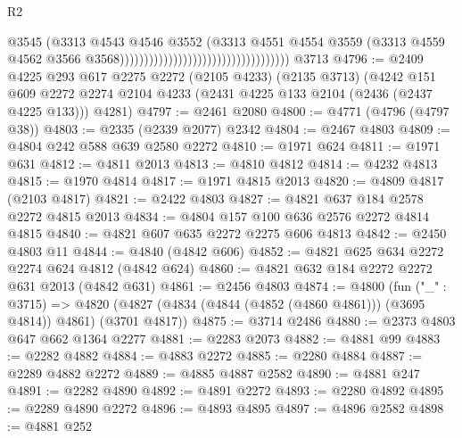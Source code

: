 \begin{lexlean}{R2}
\begin{coremodule}
                                                                    @3545
                                                                    (@3313
                                                                      @4543
                                                                      @4546
                                                                      @3552
                                                                      (@3313
                                                                        @4551
                                                                        @4554
                                                                        @3559
                                                                        (@3313
                                                                          @4559
                                                                          @4562
                                                                          @3566
                                                                          @3568)))))))))))))))))))))))))))))))))))
    @3713
@4796 := @2409
    @4225
    @293
    @617
    @2275
    @2272
    (@2105 @4233)
    (@2135 @3713)
    (@4242
      @151
      @609
      @2272
      @2274
      @2104
      @4233
      (@2431 @4225 @133 @2104 (@2436 (@2437 @4225 @133)))
      @4281)
@4797 := @2461 @2080
@4800 := @4771 (@4796 (@4797 @38))
@4803 := @2335 (@2339 @2077) @2342
@4804 := @2467 @4803
@4809 := @4804 @242 @588 @639 @2580 @2272
@4810 := @1971 @624
@4811 := @1971 @631
@4812 := @4811 @2013
@4813 := @4810 @4812
@4814 := @4232 @4813
@4815 := @1970 @4814
@4817 := @1971 @4815 @2013
@4820 := @4809 @4817 (@2103 @4817)
@4821 := @2422 @4803
@4827 := @4821 @637 @184 @2578 @2272 @4815 @2013
@4834 := @4804 @157 @100 @636 @2576 @2272 @4814 @4815
@4840 := @4821 @607 @635 @2272 @2275 @606 @4813
@4842 := @2450 @4803 @11
@4844 := @4840 (@4842 @606)
@4852 := @4821 @625 @634 @2272 @2274 @624 @4812 (@4842 @624)
@4860 := @4821 @632 @184 @2272 @2272 @631 @2013 (@4842 @631)
@4861 := @2456 @4803
@4874 := @4800
    (fun ("_" : @3715) =>
    @4820 (@4827 (@4834 (@4844 (@4852 (@4860 @4861))) (@3695 @4814)) @4861) (@3701 @4817))
@4875 := @3714 @2486
@4880 := @2373 @4803 @647 @662 @1364 @2277
@4881 := @2283 @2073
@4882 := @4881 @99
@4883 := @2282 @4882
@4884 := @4883 @2272
@4885 := @2280 @4884
@4887 := @2289 @4882 @2272
@4889 := @4885 @4887 @2582
@4890 := @4881 @247
@4891 := @2282 @4890
@4892 := @4891 @2272
@4893 := @2280 @4892
@4895 := @2289 @4890 @2272
@4896 := @4893 @4895
@4897 := @4896 @2582
@4898 := @4881 @252

\end{coremodule}
\end{lexlean}
